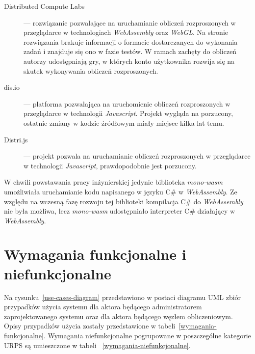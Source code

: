 \documentclass[a4paper,11pt,twoside]{report}
\theoremstyle{definition}
\begin{document}
        \begin{description}
            \item[Distributed Compute Labs~\cite{distributed-compute-labs}] --- rozwiązanie pozwalające na uruchamianie obliczeń rozproszonych w przeglądarce w technologiach \textit{WebAssembly} oraz \textit{WebGL}. Na stronie rozwiązania brakuje informacji o formacie dostarczanych do wykonania zadań i znajduje się ono w fazie testów. W ramach zachęty do obliczeń autorzy udostępniają gry, w których konto użytkownika rozwija się na skutek wykonywania obliczeń rozproszonych.
            \item[dis.io~\cite{dis-io}] --- platforma pozwalająca na uruchomienie obliczeń rozproszonych w przeglądarce w technologii \textit{Javascript}. Projekt wygląda na porzucony, ostatnie zmiany w kodzie źródłowym miały miejsce kilka lat temu.
            \item[Distri.js~\cite{distri-js}] --- projekt pozwala na uruchamianie obliczeń rozproszonych w przeglądarce w technologii \textit{Javascript}, prawdopodobnie jest porzucony.
        \end{description}
        
        
        W chwili powstawania pracy inżynierskiej jedynie biblioteka \textit{mono-wasm} umożliwiała uruchamianie kodu napisanego w języku C\# w \textit{WebAssembly}.
        Ze względu na wczesną fazę rozwoju tej biblioteki kompilacja C\# do \textit{WebAssembly} nie była możliwa, lecz \textit{mono-wasm} udostępniało interpreter C\# działający w \textit{WebAssembly}.
        
		\section{Wymagania funkcjonalne i niefunkcjonalne}
                
            Na rysunku~\ref{use-cases-diagram} przedstawiono w postaci diagramu UML zbiór przypadków użycia systemu dla aktora będącego administratorem zaprojektowanego systemu oraz dla aktora będącego węzłem obliczeniowym. Opisy przypadków użycia zostały przedstawione w tabeli~\ref{wymagania-funkcjonalne}. Wymagania niefunkcjonalne pogrupowane w poszczególne kategorie URPS są umieszczone w tabeli ~\ref{wymagania-niefunkcjonalne}.
            
\end{document}
